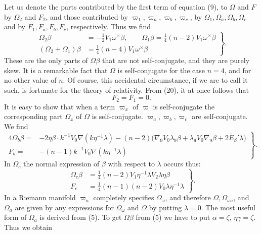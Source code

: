 \documentclass[11pt]{article}
\begin{document}
\indent Let us denote the parts contributed by the first term of equation (9), to $\Omega$ and $F$ by $\Omega_2$ and $F_2$, and those contributed by $\varpi_1,\varpi_a,\varpi_b,\varpi_c$, by $\Omega_1,\Omega_a,\Omega_b,\Omega_c$ and by $F_1,F_a,F_b,F_c$, respectively. Thus we find
\begin{equation}
\left.\begin{aligned}
\Omega_2\beta&=-\tfrac12V_1\omega^\times\beta,\qquad \Omega_1\beta=\tfrac14(n-2)V_1\omega^\times\beta\\
(\Omega_2+\Omega_1)\beta&=\tfrac14(n-4)V_1\omega^\times\beta
\end{aligned}\right\}.\tag{20}
\end{equation}
These are the only parts of $\Omega\beta$ that are not self-conjugate, and they are purely skew. It is a remarkable fact that $\Omega$ is self-conjugate for the case $n=4$, and for no other value of $n$. Of course, this accidental circumstance, if we are to call it such, is fortunate for the theory of relativity. From (20), it at once follows that
\begin{equation}F_2=F_1=0.\tag{21}\end{equation}
It is easy to show that when a term $\varpi_x$ of $\varpi$ is self-conjugate the corresponding part $\Omega_x$ of $\Omega$ is self-conjugate. $\varpi_a,\varpi_b,\varpi_c$ are self-conjugate. We find
\begin{equation}
\left.\begin{aligned}
4\Omega_b\beta={}&-2\eta\beta\mathbin{\cdot}k^{-1}V_0\nabla(k\eta^{-1}\lambda)-(n-2)\bigl(\nabla_9V_0\lambda_9\beta+\lambda_9V_0\nabla_9\beta+2\bar E_\beta'\lambda\bigr)\\
F_b={}&-(n-1)k^{-1}V_0\nabla(k\eta^{-1}\lambda)
\end{aligned}\right\}.\tag{22}
\end{equation}
In $\Omega_c$ the normal expression of $\beta$ with respect to $\lambda$ occurs thus:
\begin{equation}
\left.\begin{aligned}
\Omega_c\beta&=\tfrac14(n-2)V_1\eta^{-1}\lambda V_2\lambda\eta\beta\\
F_c&=\tfrac14(n-1)(n-2)V_0\lambda\eta^{-1}\lambda
\end{aligned}\right\}.\tag{23}
\end{equation}
In a Riemann manifold $\varpi_a$ completely specifies $\Omega_\omega$, and therefore $\Omega,\Omega_{\omega a}$, and $\Omega_a$ are given by any expressions for $\Omega_\omega$ and $\Omega$ by putting $\lambda=0$. The most useful form of $\Omega_a$ is derived from (5). To get $\Omega\beta$ from (5) we have to put $\alpha=\zeta$, $\eta\gamma=\zeta$. Thus we obtain
\end{document}
